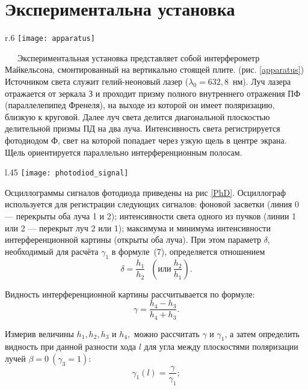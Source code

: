 \documentclass{MagicLabs}
\begin{document}
\section{Экспериментальна установка}

\begin{wrapfigure}[17]{r}{.6\textwidth}\centering
	\vspace{-3ex}
	\texttt{[image: apparatus]}
	\caption{Схема установки}
	\label{apparatus}
\end{wrapfigure}

\ \ \ Экспериментальная установка представляет собой интерферометр Майкельсона,
смонтированный на вертикально стоящей плите. (рис. \ref{apparatus}) Источником света служит 
гелий-неоновый лазер ($ \lambda_0 = 632,8$~нм). Луч лазера отражается от зеркала З 
и проходит призму полного внутреннего отражения ПФ (параллелепипед Френеля), 
на выходе из которой он имеет поляризацию, близкую к круговой.
Далее луч света делится диагональной плоскостью делительной призмы ПД на два луча.
Интенсивность света регистрируется фотодиодом Ф, свет на которой попадает через 
узкую щель в центре экрана. Щель ориентируется параллельно интерференционным полосам. 

\begin{wrapfigure}[13]{l}{.45\textwidth}\centering
	\vspace{-5ex}
	\texttt{[image: photodiod\_signal]}
	\caption{Осциллограмма сигналов Ф}
	\label{PhD}
\end{wrapfigure}

Осциллограммы сигналов фотодиода приведены на рис \ref{PhD}. Осциллограф используется для
регистрации следующих сигналов: фоновой засветки (линия 0 — перекрыты оба луча 1 и 2);
интенсивности света одного из пучков (линии 1 или 2 — перекрыт луч 2 или 1); максимума 
и минимума интенсивности интерференционной картины (открыты оба луча). 
При этом параметр $ \delta $, необходимый для расчёта $ \gamma_1 $ в формуле~(7),
определяется отношением
\begin{equation}\label{delta}
	\delta = \dfrac{h_1}{h_2}~~~\left(или~\dfrac{h_2}{h_1}\right).
\end{equation}

Видность интерференционной картины рассчитывается по формуле:
\begin{equation}\label{gamma}
	\gamma = \dfrac{h_4 - h_3}{h_4 + h_3}.
\end{equation}

Измерив величины $ h_1, h_2, h_3 $ и $ h_4, $ можно рассчитать $ \gamma $ и $ \gamma_1 $, 
а затем определить видность при данной разности хода $ l $ для угла между плоскостями
поляризации лучей $ \beta = 0~(\gamma_3 = 1): $
\begin{equation}\label{gamma1}
	\gamma_1(l) = \dfrac{\gamma}{\gamma_1};
\end{equation}
\end{document}
